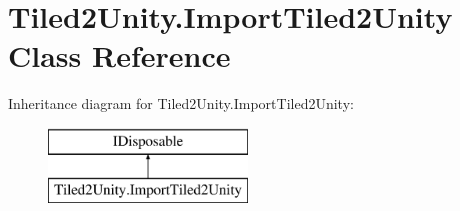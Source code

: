 \hypertarget{class_tiled2_unity_1_1_import_tiled2_unity}{}\section{Tiled2\+Unity.\+Import\+Tiled2\+Unity Class Reference}
\label{class_tiled2_unity_1_1_import_tiled2_unity}
Inheritance diagram for Tiled2\+Unity.\+Import\+Tiled2\+Unity\+:\begin{figure}[H]
\begin{center}
\leavevmode
\includegraphics[height=2.000000cm]{class_tiled2_unity_1_1_import_tiled2_unity}
\end{center}
\end{figure}

